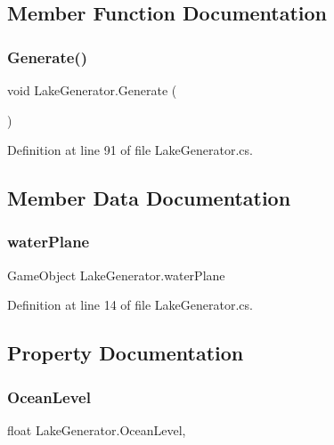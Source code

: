 \subsection{Member Function Documentation}
\mbox{\label{class_lake_generator_a99b5bed2f3bea9307e65622151916a13}} 
\subsubsection{Generate()}
{\footnotesize\ttfamily void Lake\+Generator.\+Generate (\begin{DoxyParamCaption}{ }\end{DoxyParamCaption})}



Definition at line 91 of file Lake\+Generator.\+cs.



\subsection{Member Data Documentation}
\mbox{\label{class_lake_generator_a5342f68e971b5650072718ff8c2c7db0}} 
\subsubsection{water\+Plane}
{\footnotesize\ttfamily Game\+Object Lake\+Generator.\+water\+Plane}



Definition at line 14 of file Lake\+Generator.\+cs.



\subsection{Property Documentation}
\mbox{\label{class_lake_generator_a4b3743ad53af071b63efc7e5722a8980}} 
\subsubsection{Ocean\+Level}
{\footnotesize\ttfamily float Lake\+Generator.\+Ocean\+Level\hspace{0.3cm}{\ttfamily [get]}, {\ttfamily [set]}}




